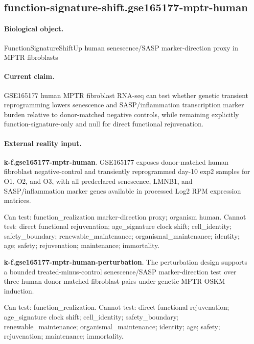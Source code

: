 \subsection{function-signature-shift.gse165177-mptr-human}

\paragraph{Biological object.} FunctionSignatureShiftUp human senescence/SASP marker-direction proxy in MPTR fibroblasts

\paragraph{Current claim.} GSE165177 human MPTR fibroblast RNA-seq can test whether genetic transient reprogramming lowers senescence and SASP/inflammation transcription marker burden relative to donor-matched negative controls, while remaining explicitly function-signature-only and null for direct functional rejuvenation.

\paragraph{External reality input.}
\textbf{k-f.gse165177-mptr-human}. GSE165177 exposes donor-matched human fibroblast negative-control and transiently reprogrammed day-10 exp2 samples for O1, O2, and O3, with all predeclared senescence, LMNB1, and SASP/inflammation marker genes available in processed Log2 RPM expression matrices.

Can test: function\_realization marker-direction proxy; organism human. Cannot test: direct functional rejuvenation; age\_signature clock shift; cell\_identity; safety\_boundary; renewable\_maintenance; organismal\_maintenance; identity; age; safety; rejuvenation; maintenance; immortality.

\textbf{k-f.gse165177-mptr-human-perturbation}. The perturbation design supports a bounded treated-minus-control senescence/SASP marker-direction test over three human donor-matched fibroblast pairs under genetic MPTR OSKM induction.

Can test: function\_realization. Cannot test: direct functional rejuvenation; age\_signature clock shift; cell\_identity; safety\_boundary; renewable\_maintenance; organismal\_maintenance; identity; age; safety; rejuvenation; maintenance; immortality.

